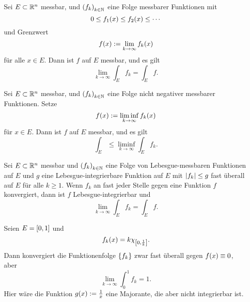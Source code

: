 \begin{proposition}\label{prop:1-16}
	Sei \(E \subset \R^n\) messbar, und \(\parentheses*{f_k}_{k \in \N}\) eine Folge messbarer Funktionen mit
	\begin{equation}
		0 \le f_1\parentheses*{x} \le f_2\parentheses*{x} \le \cdots
	\end{equation}
	und Grenzwert
	\begin{equation}
		f\parentheses*{x} := \lim_{k \to \infty}f_k\parentheses*{x}
	\end{equation}
	für alle \(x \in E\).
	Dann ist \(f\) auf \(E\) messbar, und es gilt
	\begin{equation}\label{eq:1-26}
		\lim_{k \to \infty}\int_E f_k = \int_E f.
	\end{equation}
\end{proposition}

\begin{lemma}\label{lem:1-17}
	Sei \(E \subset \R^n\) messbar, und \(\parentheses*{f_k}_{k \in \N}\) eine Folge nicht negativer messbarer Funktionen.
	Setze
	\begin{equation}
		f\parentheses*{x} := \liminf_{k \to \infty}f_k\parentheses*{x}
	\end{equation}
	für \(x \in E\).
	Dann ist \(f\) auf \(E\) messbar, und es gilt
	\begin{equation}
		\int_E \le \liminf_{k \to \infty}\int_E f_k.
	\end{equation}
\end{lemma}

\begin{proposition}
	Sei \(E \subset \R^n\) messbar und \(\parentheses*{f_k}_{k \in \N}\) eine Folge von Lebesgue-messbaren Funktionen auf \(E\) und \(g\) eine Lebesgue-integrierbare Funktion auf \(E\) mit \(\absolute*{f_k} \le g\) fast überall auf \(E\) für alle \(k \ge 1\).
	Wenn \(f_k\) an fast jeder Stelle gegen eine Funktion \(f\) konvergiert, dann ist \(f\) Lebesgue-integrierbar und
	\begin{equation}
		\lim_{k \to \infty}\int_E f_k = \int_E f.
	\end{equation}
\end{proposition}

\begin{example}
	Seien \(E = \brackets*{0, 1}\) und
	\[
		f_k\parentheses*{x} = k\chi_{\brackets*{0, \frac{1}{k}}}.
	\]
	Dann konvergiert die Funktionenfolge \(\braces*{f_k}\) zwar fast überall gegen \(f\parentheses*{x} \equiv 0\), aber
	\[
		\lim_{k \to \infty}\int_0^1 f_k = 1.
	\]
	Hier wäre die Funktion \(g\parentheses*{x} := \frac{1}{x}\) eine Majorante, die aber nicht integrierbar ist.
\end{example}


